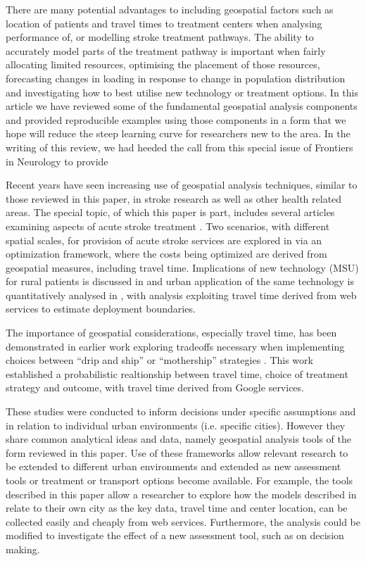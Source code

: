 \documentclass[utf8]{frontiersHLTH}
\begin{document}
There are many potential advantages to including geospatial factors
such as location of patients and travel times to treatment centers
when analysing performance of, or modelling stroke treatment
pathways. The ability to accurately model parts of the treatment
pathway is important when fairly allocating limited resources,
optimising the placement of those resources, forecasting changes in
loading in response to change in population distribution and
investigating how to best utilise new technology or treatment
options. In this article we have reviewed some of the fundamental
geospatial analysis components and provided reproducible examples
using those components in a form that we hope will reduce the steep
learning curve for researchers new to the area. In the writing of this review, we had heeded the call from this special issue of Frontiers in Neurology to provide 

Recent years have seen increasing use of geospatial analysis
techniques, similar to those reviewed in this paper, in stroke
research as well as other health related areas. The special topic, of
which this paper is part, includes several articles examining aspects
of acute stroke treatment \cite{10.3389/fneur.2019.00150,
  10.3389/fneur.2019.00159, 10.3389/fneur.2019.00331}.  Two scenarios,
with different spatial scales, for provision of acute stroke services
are explored in \cite{10.3389/fneur.2019.00150} via an optimization
framework, where the costs being optimized are derived from geospatial
measures, including travel time. Implications of new technology (MSU)
for rural patients is discussed in \cite{10.3389/fneur.2019.00159} and
urban application of the same technology is quantitatively analysed in
\cite{10.3389/fneur.2019.00331}, with analysis exploiting travel time
derived from web services to estimate deployment boundaries.

The importance of geospatial considerations, especially travel time,
has been demonstrated in earlier work exploring tradeoffs necessary
when implementing choices between ``drip and ship'' or ``mothership''
strategies \cite{10.1001/jamaneurol.2018.2424,Milne_2017}. This work
established a probabilistic realtionship between travel time, choice
of treatment strategy and outcome, with travel time derived from
Google services.

These studies were conducted to inform decisions under specific
assumptions and in relation to individual urban environments
(i.e. specific cities). However they share common analytical ideas and
data, namely geospatial analysis tools of the form reviewed in this
paper. Use of these frameworks allow relevant research to be extended
to different urban environments and extended as new assessment tools
or treatment or transport options become available. For example, the
tools described in this paper allow a researcher to explore how the
models described in \cite{10.1001/jamaneurol.2018.2424,Milne_2017}
relate to their own city as the key data, travel time and center
location, can be collected easily and cheaply from web
services. Furthermore, the analysis could be modified to investigate
the effect of a new assessment tool, such as
\cite{10.3389/fneur.2019.00130} on decision making.
\end{document}
